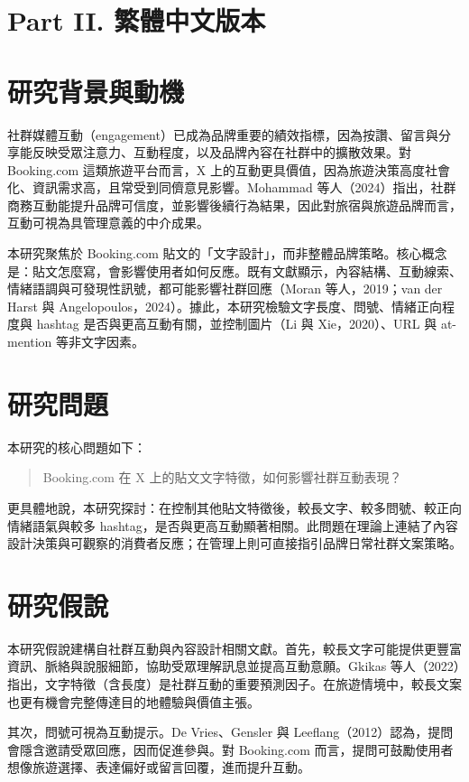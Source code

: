 \documentclass[12pt,a4paper,fontset=none]{ctexart}
\begin{document}
\newpage
\section*{Part II. 繁體中文版本}

\section{研究背景與動機}
社群媒體互動（engagement）已成為品牌重要的績效指標，因為按讚、留言與分享能反映受眾注意力、互動程度，以及品牌內容在社群中的擴散效果。對 Booking.com 這類旅遊平台而言，X 上的互動更具價值，因為旅遊決策高度社會化、資訊需求高，且常受到同儕意見影響。Mohammad 等人（2024）指出，社群商務互動能提升品牌可信度，並影響後續行為結果，因此對旅宿與旅遊品牌而言，互動可視為具管理意義的中介成果。

本研究聚焦於 Booking.com 貼文的「文字設計」，而非整體品牌策略。核心概念是：貼文怎麼寫，會影響使用者如何反應。既有文獻顯示，內容結構、互動線索、情緒語調與可發現性訊號，都可能影響社群回應（Moran 等人，2019；van der Harst 與 Angelopoulos，2024）。據此，本研究檢驗文字長度、問號、情緒正向程度與 hashtag 是否與更高互動有關，並控制圖片（Li 與 Xie，2020）、URL 與 at-mention 等非文字因素。

\section{研究問題}
本研究的核心問題如下：

\begin{quote}
Booking.com 在 X 上的貼文文字特徵，如何影響社群互動表現？
\end{quote}

更具體地說，本研究探討：在控制其他貼文特徵後，較長文字、較多問號、較正向情緒語氣與較多 hashtag，是否與更高互動顯著相關。此問題在理論上連結了內容設計決策與可觀察的消費者反應；在管理上則可直接指引品牌日常社群文案策略。

\section{研究假說}
本研究假說建構自社群互動與內容設計相關文獻。首先，較長文字可能提供更豐富資訊、脈絡與說服細節，協助受眾理解訊息並提高互動意願。Gkikas 等人（2022）指出，文字特徵（含長度）是社群互動的重要預測因子。在旅遊情境中，較長文案也更有機會完整傳達目的地體驗與價值主張。

其次，問號可視為互動提示。De Vries、Gensler 與 Leeflang（2012）認為，提問會隱含邀請受眾回應，因而促進參與。對 Booking.com 而言，提問可鼓勵使用者想像旅遊選擇、表達偏好或留言回覆，進而提升互動。
\end{document}
